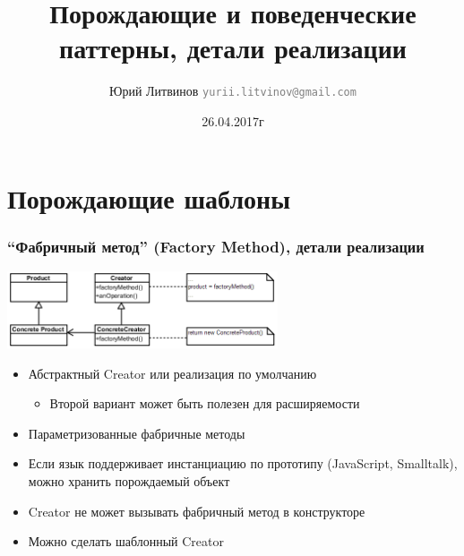 \documentclass[xetex,mathserif,serif]{beamer}
\title{Порождающие и поведенческие паттерны, детали реализации}
\author[Юрий Литвинов]{Юрий Литвинов \newline \textcolor{gray}{\small\texttt{yurii.litvinov@gmail.com}}}
\date{26.04.2017г}
\begin{document}
	
	\frame{\titlepage}

	\section{Порождающие шаблоны}

	\begin{frame}
		\frametitle{``Фабричный метод'' (Factory Method), детали реализации}
		\begin{center}
			\includegraphics[width=0.6\textwidth]{factoryMethod.png}
		\end{center}
		\begin{itemize}
			\item Абстрактный Creator или реализация по умолчанию
			\begin{itemize}
				\item Второй вариант может быть полезен для расширяемости
			\end{itemize}
			\item Параметризованные фабричные методы
			\item Если язык поддерживает инстанциацию по прототипу (JavaScript, Smalltalk), можно хранить порождаемый объект
			\item Creator не может вызывать фабричный метод в конструкторе
			\item Можно сделать шаблонный Creator
		\end{itemize}
	\end{frame}
\end{document}
